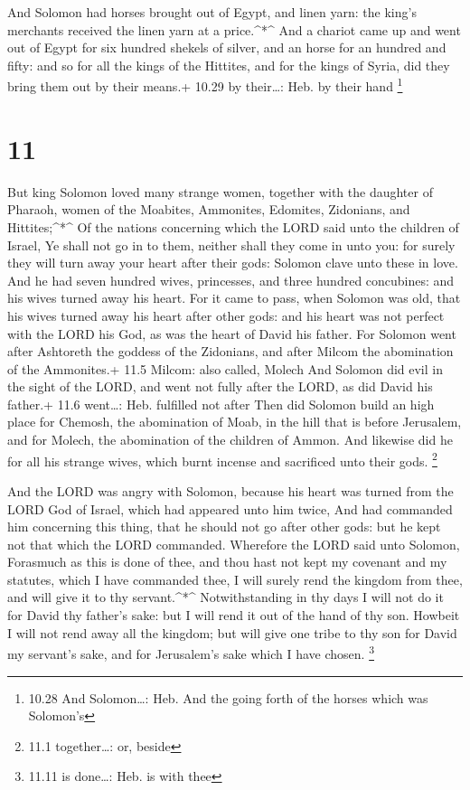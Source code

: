  And Solomon had horses brought out of Egypt, and linen
yarn: the king's merchants received the linen yarn at a price.\^{}*\^{}
 And a chariot came up and went out of Egypt for six
hundred shekels of silver, and an horse for an hundred and fifty: and so
for all the kings of the Hittites, and for the kings of Syria, did they
bring them out by their means.+ 10.29 by their\ldots: Heb. by their hand
\footnote{10.28 And Solomon\ldots: Heb. And the going forth of the
  horses which was Solomon's}

\hypertarget{section-10}{%
\section{11}\label{section-10}}

 But king Solomon loved many strange women, together with
the daughter of Pharaoh, women of the Moabites, Ammonites, Edomites,
Zidonians, and Hittites;\^{}*\^{}  Of the nations concerning
which the LORD said unto the children of Israel, Ye shall not go in to
them, neither shall they come in unto you: for surely they will turn
away your heart after their gods: Solomon clave unto these in love.
 And he had seven hundred wives, princesses, and three
hundred concubines: and his wives turned away his heart. 
For it came to pass, when Solomon was old, that his wives turned away
his heart after other gods: and his heart was not perfect with the LORD
his God, as was the heart of David his father.  For Solomon
went after Ashtoreth the goddess of the Zidonians, and after Milcom the
abomination of the Ammonites.+ 11.5 Milcom: also called, Molech
 And Solomon did evil in the sight of the LORD, and went not
fully after the LORD, as did David his father.+ 11.6 went\ldots: Heb.
fulfilled not after  Then did Solomon build an high place
for Chemosh, the abomination of Moab, in the hill that is before
Jerusalem, and for Molech, the abomination of the children of Ammon.
 And likewise did he for all his strange wives, which burnt
incense and sacrificed unto their gods. \footnote{11.1 together\ldots:
  or, beside}

 And the LORD was angry with Solomon, because his heart was
turned from the LORD God of Israel, which had appeared unto him twice,
 And had commanded him concerning this thing, that he
should not go after other gods: but he kept not that which the LORD
commanded.  Wherefore the LORD said unto Solomon, Forasmuch
as this is done of thee, and thou hast not kept my covenant and my
statutes, which I have commanded thee, I will surely rend the kingdom
from thee, and will give it to thy servant.\^{}*\^{} 
Notwithstanding in thy days I will not do it for David thy father's
sake: but I will rend it out of the hand of thy son. 
Howbeit I will not rend away all the kingdom; but will give one tribe to
thy son for David my servant's sake, and for Jerusalem's sake which I
have chosen. \footnote{11.11 is done\ldots: Heb. is with thee}

